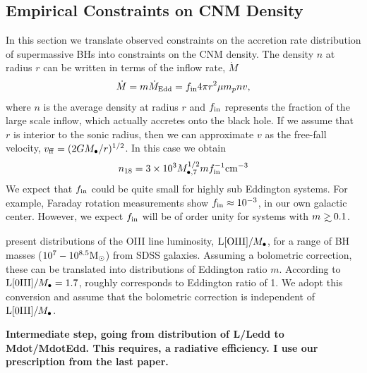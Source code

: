 \documentclass[usenatbib,fleqn]{mnras}
\newcommand\gsim{\mathrel{\rlap{\lower4pt\hbox{\hskip1pt$\sim$}}
    \raise1pt\hbox{$>$}}}
\newcommand{\Mbh}[1][]{M_{\bullet#1}}
\newcommand{\Msun}{{\rm M_\odot}}
\begin{document}
\subsection{Empirical Constraints on CNM Density}

In this section we translate observed constraints on the accretion
rate distribution of supermassive BHs into constraints on the CNM
density.  The density $n$ at radius $r$ can be written in terms of the
inflow rate, $\dot{M}$
\begin{equation}
\dot{M} = m \dot{M}_{\rm Edd}= f_{\rm in} 4 \pi r^2 \mu m_p n v,
\label{eq:mdot}
\end{equation}
where $n$ is the average density at radius $r$ and $f_{\rm in}$
represents the fraction of the large scale inflow, which actually
accretes onto the black hole.  If we assume that $r$ is interior to
the sonic radius, then we can approximate $v$ as the free-fall
velocity, $v_{\rm ff} = (2 G \Mbh/r)^{1/2}$.  In this case we
obtain
\begin{equation}
n_{18} = 3 \times 10^3 M_{\bullet,7}^{1/2} m f_{\rm in}^{-1} {\rm
  cm}^{-3}
\label{eq:n18Edd}
\end{equation}
We expect that $f_{\rm in}$ could be quite small for highly sub
Eddington systems. For example, Faraday rotation measurements
\citep{Quataert+2000} show $f_{\rm in}\approx 10^{-3}$, in our own
galactic center. However, we expect $f_{\rm in}$ will be of order
unity for systems with $m\gsim 0.1$.  

\citet{Kauffmann&Heckman2009} present distributions of the OIII line
luminosity, ${\rm L[OIII]}/\Mbh$, for a range of BH masses
($10^7-10^{8.5} \Msun$) from SDSS galaxies.  Assuming a bolometric
correction, these can be translated into distributions of Eddington
ratio $m$.  According to \citet{Kauffmann&Heckman2009} ${\rm
  L[0III]}/\Mbh=1.7$, roughly corresponds to Eddington ratio of 1. We
adopt this conversion and assume that the bolometric correction is
independent of ${\rm L[0III]}/\Mbh$. 

{\bf Intermediate step, going from distribution of L/Ledd to
  Mdot/MdotEdd. This requires, a radiative efficiency. I use our
  prescription from the last paper. 
}
\end{document}
